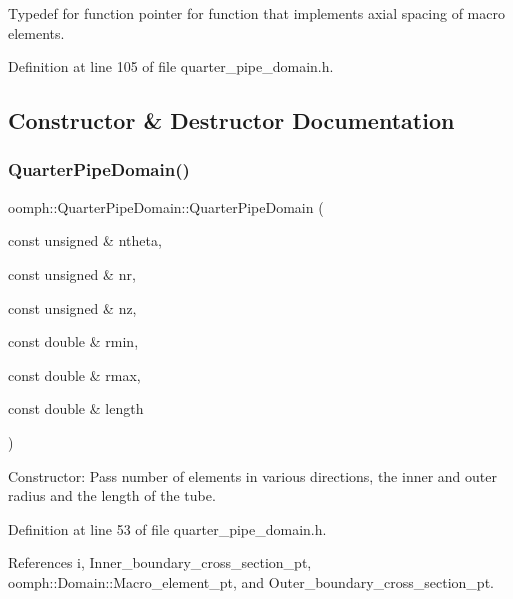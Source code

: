 Typedef for function pointer for function that implements axial spacing of macro elements. 



Definition at line 105 of file quarter\+\_\+pipe\+\_\+domain.\+h.



\subsection{Constructor \& Destructor Documentation}
\mbox{\label{classoomph_1_1QuarterPipeDomain_afb9763dac929fd4371a6ef860d9a5caf}} 
\subsubsection{\texorpdfstring{Quarter\+Pipe\+Domain()}{QuarterPipeDomain()}\hspace{0.1cm}{\footnotesize\ttfamily [1/2]}}
{\footnotesize\ttfamily oomph\+::\+Quarter\+Pipe\+Domain\+::\+Quarter\+Pipe\+Domain (\begin{DoxyParamCaption}\item[{const unsigned \&}]{ntheta,  }\item[{const unsigned \&}]{nr,  }\item[{const unsigned \&}]{nz,  }\item[{const double \&}]{rmin,  }\item[{const double \&}]{rmax,  }\item[{const double \&}]{length }\end{DoxyParamCaption})\hspace{0.3cm}{\ttfamily [inline]}}



Constructor\+: Pass number of elements in various directions, the inner and outer radius and the length of the tube. 



Definition at line 53 of file quarter\+\_\+pipe\+\_\+domain.\+h.



References i, Inner\+\_\+boundary\+\_\+cross\+\_\+section\+\_\+pt, oomph\+::\+Domain\+::\+Macro\+\_\+element\+\_\+pt, and Outer\+\_\+boundary\+\_\+cross\+\_\+section\+\_\+pt.

